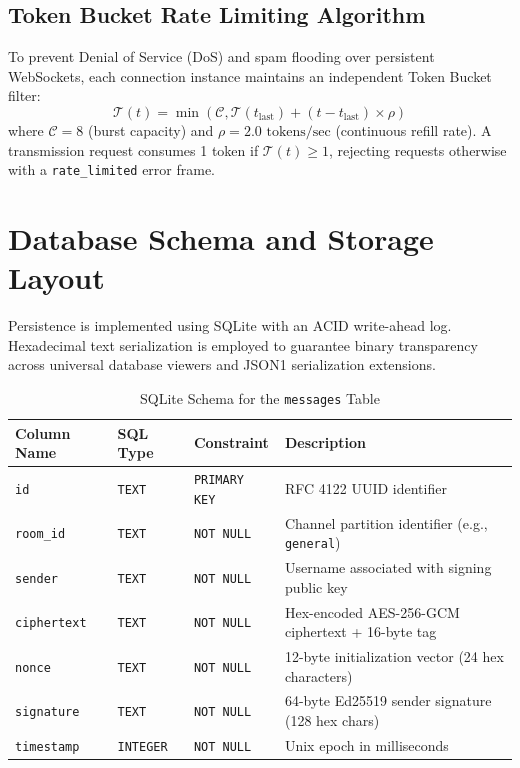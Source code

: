 \documentclass[11pt,a4paper]{article}
\begin{document}
\subsection{Token Bucket Rate Limiting Algorithm}
To prevent Denial of Service (DoS) and spam flooding over persistent WebSockets, each connection instance maintains an independent Token Bucket filter:
\begin{equation}
\mathcal{T}(t) = \min\left(\mathcal{C}, \mathcal{T}(t_{\text{last}}) + (t - t_{\text{last}}) \times \rho\right)
\end{equation}
where $\mathcal{C} = 8$ (burst capacity) and $\rho = 2.0\text{ tokens/sec}$ (continuous refill rate). A transmission request consumes 1 token if $\mathcal{T}(t) \ge 1$, rejecting requests otherwise with a \texttt{rate\_limited} error frame.

\section{Database Schema and Storage Layout}
Persistence is implemented using SQLite with an ACID write-ahead log. Hexadecimal text serialization is employed to guarantee binary transparency across universal database viewers and JSON1 serialization extensions.

\begin{table}[htbp]
\centering
\small
\begin{tabular}{@{}llll@{}}
\toprule
\textbf{Column Name} & \textbf{SQL Type} & \textbf{Constraint} & \textbf{Description} \\
\midrule
\texttt{id} & \texttt{TEXT} & \texttt{PRIMARY KEY} & RFC 4122 UUID identifier \\
\texttt{room\_id} & \texttt{TEXT} & \texttt{NOT NULL} & Channel partition identifier (e.g., \texttt{general}) \\
\texttt{sender} & \texttt{TEXT} & \texttt{NOT NULL} & Username associated with signing public key \\
\texttt{ciphertext} & \texttt{TEXT} & \texttt{NOT NULL} & Hex-encoded AES-256-GCM ciphertext + 16-byte tag \\
\texttt{nonce} & \texttt{TEXT} & \texttt{NOT NULL} & 12-byte initialization vector (24 hex characters) \\
\texttt{signature} & \texttt{TEXT} & \texttt{NOT NULL} & 64-byte Ed25519 sender signature (128 hex chars) \\
\texttt{timestamp} & \texttt{INTEGER} & \texttt{NOT NULL} & Unix epoch in milliseconds \\
\bottomrule
\end{tabular}
\caption{SQLite Schema for the \texttt{messages} Table}
\label{tab:schema}
\end{table}
\end{document}
